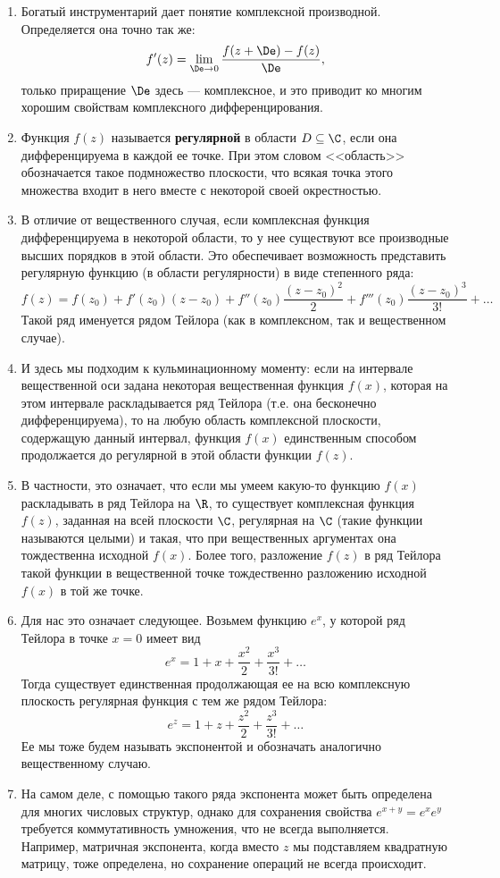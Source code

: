 \begin{enumerate}
\item Богатый инструментарий дает понятие комплексной производной. Определяется она точно так же:
$$
f'(z) = \lim_{\De\to 0}\frac{f(z+\De)-f(z)}{\De},
$$
только приращение $\De$ здесь --- комплексное, и это приводит ко многим хорошим свойствам комплексного дифференцирования.
\item Функция $f(z)$ называется \textbf{регулярной} в области $D\subseteq\C$, если она дифференцируема в каждой ее точке. При этом словом <<область>> обозначается такое подмножество плоскости, что всякая точка этого множества входит в него вместе с некоторой своей окрестностью.
\item В отличие от вещественного случая, если комплексная функция дифференцируема в некоторой области, то у нее существуют все производные высших порядков в этой области. Это обеспечивает возможность представить регулярную функцию (в области регулярности) в виде степенного ряда:
$$
f(z) = f(z_0)+f'(z_0)(z-z_0)+f''(z_0)\frac{(z-z_0)^2}{2}+f'''(z_0)\frac{(z-z_0)^3}{3!}+\dots
$$
Такой ряд именуется рядом Тейлора (как в комплексном, так и вещественном случае).
\item И здесь мы подходим к кульминационному моменту: если на интервале вещественной оси задана некоторая вещественная функция $f(x)$, которая на этом интервале раскладывается ряд Тейлора (т.е. она бесконечно дифференцируема), то на любую область комплексной плоскости, содержащую данный интервал, функция $f(x)$ единственным способом продолжается до регулярной в этой области функции $f(z)$.
\item В частности, это означает, что если мы умеем какую-то функцию $f(x)$ раскладывать в ряд Тейлора на $\R$, то существует комплексная функция $f(z)$, заданная на всей плоскости $\C$, регулярная на $\C$ (такие функции называются целыми) и такая, что при вещественных аргументах она тождественна исходной $f(x)$. Более того, разложение $f(z)$ в ряд Тейлора такой функции в вещественной точке тождественно разложению исходной $f(x)$ в той же точке.



\item Для нас это означает следующее. Возьмем функцию $e^x$, у которой ряд Тейлора в точке $x=0$ имеет вид
$$
e^x = 1+x+\frac{x^2}{2}+\frac{x^3}{3!}+\dots
$$
Тогда существует единственная продолжающая ее на всю комплексную плоскость регулярная функция с тем же рядом Тейлора:
$$
e^z = 1+z+\frac{z^2}{2}+\frac{z^3}{3!}+\dots
$$
Ее мы тоже будем называть экспонентой и обозначать аналогично вещественному случаю.
\item На самом деле, с помощью такого ряда экспонента может быть определена для многих числовых структур, однако для сохранения свойства $e^{x+y}=e^xe^y$ требуется коммутативность умножения, что не всегда выполняется. Например, матричная экспонента, когда вместо $z$ мы подставляем квадратную матрицу, тоже определена, но сохранение операций не всегда происходит.


\end{enumerate}
